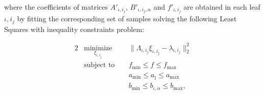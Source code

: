 \noindent where the coefficients of matrices $A'_{\iota,i_j}$, $B'_{\iota,i_j,\alpha}$ and $f'_{\iota,i_j}$ are obtained in each leaf $\iota,i_j$ by fitting the corresponding set of samples solving the following Least Squares with inequality constraints problem:

\begin{problem}\label{pbLeastSquareProblem}
	\small
	\begin{alignat}{2}
		& \nonumber \underset{\xi_{\iota,i_j}}{\text{minimize}} & &  \parallel \Lambda_{\iota,i_j} \xi_{\iota,i_j}  - \lambda_{\iota,i_j} \parallel_2^2   		 \\
		& \text{subject to }    \nonumber            & &  f_\mathrm{min} \leq f \leq f_\mathrm{max}    										  					 \\
		&                  					    	 & &  a_\mathrm{min} \leq a_{\jmath} \leq a_\mathrm{max}\label{eqInequalityConstraints} \\
		& 	                    \nonumber			 & &  b_\mathrm{min} \leq b_{\iota,\alpha} \leq b_\mathrm{max},
	\end{alignat}
	\normalsize
\end{problem}

